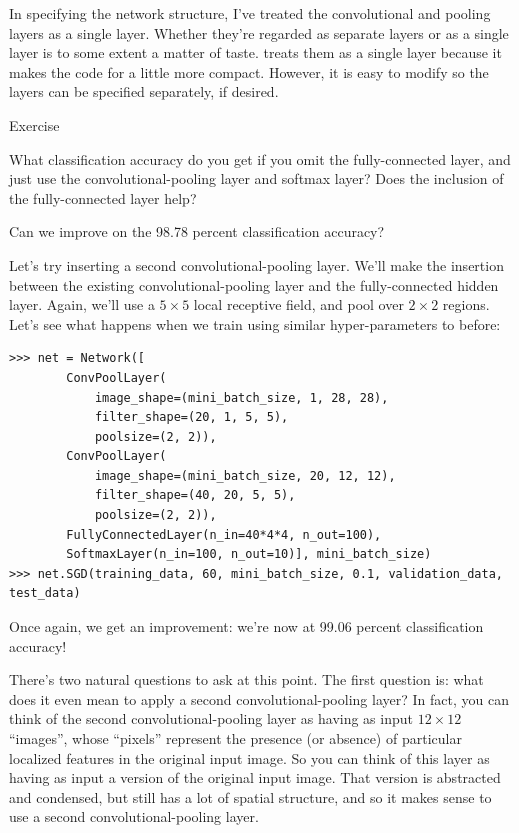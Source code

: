 \documentclass[a4paper,twoside,10pt]{book}
\begin{document}
In specifying the network structure, I've treated the convolutional and pooling layers as a single layer. Whether they're regarded as separate layers or as a single layer is to some extent a matter of taste.  treats them as a single layer because it makes the code for  a little more compact. However, it is easy to modify  so the layers can be specified separately, if desired.

\begin{exercize}{Exercise}
	\item What classification accuracy do you get if you omit the fully-connected layer, and just use the convolutional-pooling layer and softmax layer? Does the inclusion of the fully-connected layer help?
\end{exercize}
Can we improve on the 98.78 percent classification accuracy?


Let's try inserting a second convolutional-pooling layer. We'll make the insertion between the existing convolutional-pooling layer and the fully-connected hidden layer. Again, we'll use a $5\times5$ local receptive field, and pool over $2\times2$ regions. Let's see what happens when we train using similar hyper-parameters to before:

\begin{lstlisting}
>>> net = Network([
		ConvPoolLayer(
			image_shape=(mini_batch_size, 1, 28, 28), 
			filter_shape=(20, 1, 5, 5), 
			poolsize=(2, 2)),
		ConvPoolLayer(
			image_shape=(mini_batch_size, 20, 12, 12), 
			filter_shape=(40, 20, 5, 5), 
			poolsize=(2, 2)), 
		FullyConnectedLayer(n_in=40*4*4, n_out=100),
		SoftmaxLayer(n_in=100, n_out=10)], mini_batch_size)
>>> net.SGD(training_data, 60, mini_batch_size, 0.1, validation_data, test_data)        

\end{lstlisting}
Once again, we get an improvement: we're now at 99.06 percent classification accuracy!

There's two natural questions to ask at this point. The first question is: what does it even mean to apply a second convolutional-pooling layer? In fact, you can think of the second convolutional-pooling layer as having as input $12\times12$ ``images'', whose ``pixels'' represent the presence (or absence) of particular localized features in the original input image. So you can think of this layer as having as input a version of the original input image. That version is abstracted and condensed, but still has a lot of spatial structure, and so it makes sense to use a second convolutional-pooling layer.
\end{document}
